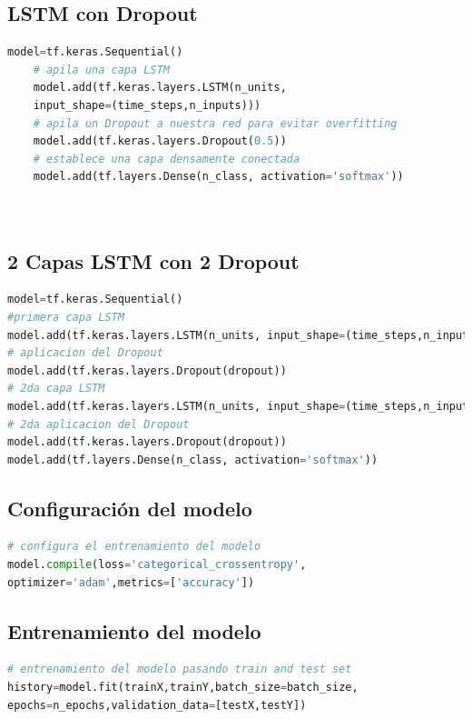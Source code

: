 \subsection{LSTM con Dropout}\label{LSTMCODEDROP}

\begin{center}
	\begin{lstlisting}[language=Python,caption=Modelo LSTM,captionpos=b,xleftmargin=.05\textwidth]
	model=tf.keras.Sequential()
	# apila una capa LSTM
	model.add(tf.keras.layers.LSTM(n_units,
	input_shape=(time_steps,n_inputs)))
	# apila un Dropout a nuestra red para evitar overfitting
	model.add(tf.keras.layers.Dropout(0.5))
	# establece una capa densamente conectada
	model.add(tf.layers.Dense(n_class, activation='softmax'))
	
	
	\end{lstlisting}
\end{center}
\subsection{2 Capas LSTM con 2 Dropout}\label{2LSTM2DROPCODE}
\begin{center}
	\begin{lstlisting}[language=Python,caption=Modelo 2 capas LSTM y 2 dropout,captionpos=b,xleftmargin=.05\textwidth]
model=tf.keras.Sequential()
#primera capa LSTM
model.add(tf.keras.layers.LSTM(n_units, input_shape=(time_steps,n_inputs),return_sequences=True))
# aplicacion del Dropout
model.add(tf.keras.layers.Dropout(dropout))
# 2da capa LSTM
model.add(tf.keras.layers.LSTM(n_units, input_shape=(time_steps,n_inputs)))
# 2da aplicacion del Dropout
model.add(tf.keras.layers.Dropout(dropout))
model.add(tf.layers.Dense(n_class, activation='softmax'))
	\end{lstlisting}
\end{center}
\subsection{Configuración del modelo}\label{configmodel}
\begin{lstlisting}[language=Python,caption=Parámetros para el entrenamiento del modelo,captionpos=b,xleftmargin=.05\textwidth]
# configura el entrenamiento del modelo
model.compile(loss='categorical_crossentropy',
optimizer='adam',metrics=['accuracy'])
\end{lstlisting}
\subsection{Entrenamiento del modelo}\label{trainingmodel}
\begin{lstlisting}[language=Python,caption=Entrenamiento del modelo,captionpos=b,xleftmargin=.05\textwidth]
# entrenamiento del modelo pasando train and test set
history=model.fit(trainX,trainY,batch_size=batch_size,
epochs=n_epochs,validation_data=[testX,testY])
\end{lstlisting}

